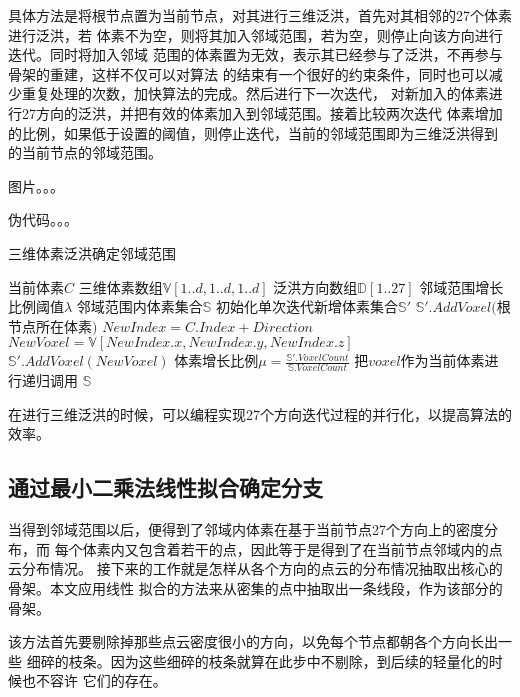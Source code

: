 具体方法是将根节点置为当前节点，对其进行三维泛洪，首先对其相邻的27个体素进行泛洪，若
体素不为空，则将其加入邻域范围，若为空，则停止向该方向进行迭代。同时将加入邻域
范围的体素置为无效，表示其已经参与了泛洪，不再参与骨架的重建，这样不仅可以对算法
的结束有一个很好的约束条件，同时也可以减少重复处理的次数，加快算法的完成。然后进行下一次迭代，
对新加入的体素进行27方向的泛洪，并把有效的体素加入到邻域范围。接着比较两次迭代
体素增加的比例，如果低于设置的阈值，则停止迭代，当前的邻域范围即为三维泛洪得到
的当前节点的邻域范围。

图片。。。

伪代码。。。

\begin{algorithm}
	\caption{三维体素泛洪确定邻域范围}
	\begin{algorithmic}[1]
		\Require 当前体素$C$
		\Require 三维体素数组$\mathbb{V}[1..d,1..d,1..d]$
		\Require 泛洪方向数组$\mathbb{D}[1..27]$
		\Require 邻域范围增长比例阈值$\lambda$
		\Ensure	邻域范围内体素集合$\mathbb{S}$
		\State 初始化单次迭代新增体素集合$\mathbb{S'}$
		\State $\mathbb{S'}.AddVoxel($根节点所在体素$)$
			\State $NewIndex = C.Index + Direction$
			\State $NewVoxel = \mathbb{V}[NewIndex.x,NewIndex.y,NewIndex.z]$
				\State $\mathbb{S'}.AddVoxel(NewVoxel)$
			\EndIf
		\EndFor
		\State 体素增长比例$\mu=\frac{\mathbb{S'}.VoxelCount}{\mathbb{S}.VoxelCount}$
		\If{$\mu > \lambda$}
				\State 把$voxel$作为当前体素进行递归调用
			\EndFor
		\EndIf
		\State \Return $\mathbb{S}$
	\end{algorithmic}
\end{algorithm}

在进行三维泛洪的时候，可以编程实现27个方向迭代过程的并行化，以提高算法的效率。

\subsection{通过最小二乘法线性拟合确定分支}
当得到邻域范围以后，便得到了邻域内体素在基于当前节点27个方向上的密度分布，而
每个体素内又包含着若干的点，因此等于是得到了在当前节点邻域内的点云分布情况。
接下来的工作就是怎样从各个方向的点云的分布情况抽取出核心的骨架。本文应用线性
拟合的方法来从密集的点中抽取出一条线段，作为该部分的骨架。

该方法首先要剔除掉那些点云密度很小的方向，以免每个节点都朝各个方向长出一些
细碎的枝条。因为这些细碎的枝条就算在此步中不剔除，到后续的轻量化的时候也不容许
它们的存在。

